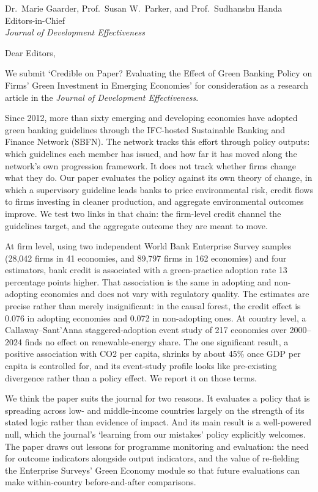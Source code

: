 \documentclass[11pt]{letter}
\date{\today}
\begin{document}
\begin{letter}{Dr.\ Marie Gaarder, Prof.\ Susan W.\ Parker, and Prof.\ Sudhanshu Handa\\Editors-in-Chief\\\textit{Journal of Development Effectiveness}}

\opening{Dear Editors,}

We submit `Credible on Paper? Evaluating the Effect of Green Banking Policy on Firms' Green Investment in Emerging Economies' for consideration as a research article in the \textit{Journal of Development Effectiveness}.

Since 2012, more than sixty emerging and developing economies have adopted green banking guidelines through the IFC-hosted Sustainable Banking and Finance Network (SBFN). The network tracks this effort through policy outputs: which guidelines each member has issued, and how far it has moved along the network's own progression framework. It does not track whether firms change what they do. Our paper evaluates the policy against its own theory of change, in which a supervisory guideline leads banks to price environmental risk, credit flows to firms investing in cleaner production, and aggregate environmental outcomes improve. We test two links in that chain: the firm-level credit channel the guidelines target, and the aggregate outcome they are meant to move.

At firm level, using two independent World Bank Enterprise Survey samples (28,042 firms in 41 economies, and 89,797 firms in 162 economies) and four estimators, bank credit is associated with a green-practice adoption rate 13 percentage points higher. That association is the same in adopting and non-adopting economies and does not vary with regulatory quality. The estimates are precise rather than merely insignificant: in the causal forest, the credit effect is 0.076 in adopting economies and 0.072 in non-adopting ones. At country level, a Callaway--Sant'Anna staggered-adoption event study of 217 economies over 2000--2024 finds no effect on renewable-energy share. The one significant result, a positive association with CO2 per capita, shrinks by about 45\% once GDP per capita is controlled for, and its event-study profile looks like pre-existing divergence rather than a policy effect. We report it on those terms.

We think the paper suits the journal for two reasons. It evaluates a policy that is spreading across low- and middle-income countries largely on the strength of its stated logic rather than evidence of impact. And its main result is a well-powered null, which the journal's `learning from our mistakes' policy explicitly welcomes. The paper draws out lessons for programme monitoring and evaluation: the need for outcome indicators alongside output indicators, and the value of re-fielding the Enterprise Surveys' Green Economy module so that future evaluations can make within-country before-and-after comparisons.


\end{letter}
\end{document}
